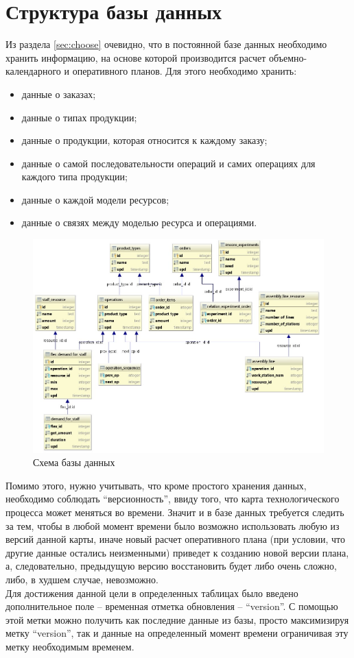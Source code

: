 \section{Структура базы данных}

\indent Из раздела \ref{sec:choose} очевидно, что в постоянной базе данных необходимо хранить информацию, на основе которой производится расчет объемно-календарного и оперативного планов.
Для этого необходимо хранить:

\begin{itemize}
	\item данные о заказах;
	\item данные о типах продукции;
	\item данные о продукции, которая относится к каждому заказу;
	\item данные о самой последовательности операций и самих операциях для каждого типа продукции;
	\item данные о каждой модели ресурсов;
	\item данные о связях между моделью ресурса и операциями.
\end{itemize}

\begin{figure}[ht]
	\centering
	\includegraphics[width=\linewidth]{pics/databaseSchema.png}
	\caption{Схема базы данных}
	\label{fig:dbSchema}
\end{figure}

\indent Помимо этого, нужно учитывать, что кроме простого хранения данных, необходимо соблюдать ``версионность'', ввиду того, что карта технологического процесса может меняться во времени.
Значит и в базе данных требуется следить за тем, чтобы в любой момент времени было возможно использовать любую из версий данной карты, иначе новый расчет оперативного плана (при условии, что другие данные остались неизменными) приведет к созданию новой версии плана, а, следовательно, предыдущую версию восстановить будет либо очень сложно, либо, в худшем случае, невозможно.\\
\indent Для достижения данной цели в определенных таблицах было введено дополнительное поле -- временная отметка обновления -- ``version''.
С помощью этой метки можно получить как последние данные из базы, просто максимизируя метку ``version'', так и данные на определенный момент времени ограничивая эту метку необходимым временем.